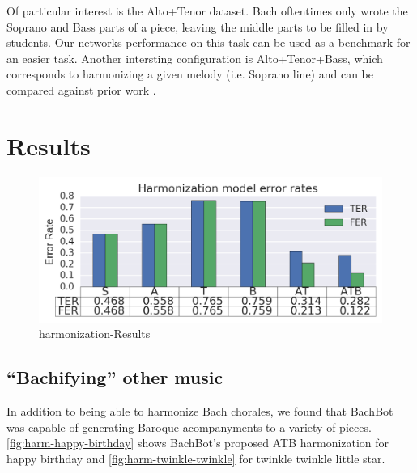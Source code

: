 
Of particular interest is the Alto+Tenor dataset. Bach oftentimes only wrote
the Soprano and Bass parts of a piece, leaving the middle parts to be filled in
by students. Our networks performance on this task can be used as a benchmark
for an easier task. Another intersting configuration is Alto+Tenor+Bass, which
corresponds to harmonizing a given melody (i.e. Soprano line) and can be
compared against prior work .

\section{Results}


\begin{figure}[htpb]
  \centering
  \includegraphics[width=1.0\linewidth]{harmonization-results.png}
  \caption{harmonization-Results}
  \label{fig:harmonization-results}
\end{figure}

\subsection{``Bachifying'' other music}

In addition to being able to harmonize Bach chorales, we found that BachBot was capable
of generating Baroque acompanyments to a variety of pieces. \cref{fig:harm-happy-birthday}
shows BachBot's proposed ATB harmonization for happy birthday
and \cref{fig:harm-twinkle-twinkle} for twinkle twinkle little star.


